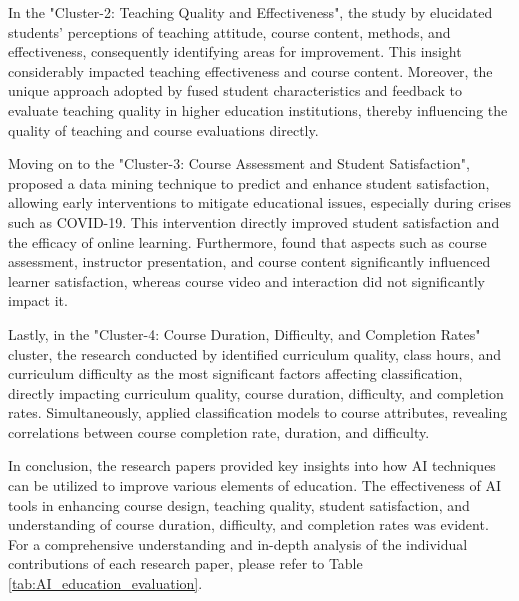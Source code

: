 In the "Cluster-2: Teaching Quality and Effectiveness", the study by \cite{Research_on_Project-Based_Teaching_Quality_Evaluation_Based_on_Fuzzy_Cluster_Analysis} elucidated students' perceptions of teaching attitude, course content, methods, and effectiveness, consequently identifying areas for improvement. This insight considerably impacted teaching effectiveness and course content. Moreover, the unique approach adopted by \cite{Evaluating_the_quality_of_teaching_in_higher_education_institutes_using_clustering_approach_and_set_pair_analysis} fused student characteristics and feedback to evaluate teaching quality in higher education institutions, thereby influencing the quality of teaching and course evaluations directly.

Moving on to the "Cluster-3: Course Assessment and Student Satisfaction", \cite{An_Efficient_Data_Mining_Technique_for_Assessing_Satisfaction_Level_With_Online_Learning_for_Higher_Education_Students_During_the_COVID-19} proposed a data mining technique to predict and enhance student satisfaction, allowing early interventions to mitigate educational issues, especially during crises such as COVID-19. This intervention directly improved student satisfaction and the efficacy of online learning. Furthermore, \cite{What_predicts_student_satisfaction_with_MOOCs:_A_gradient_boosting_trees_supervised_machine_learning_and_sentiment_analysis_approach} found that aspects such as course assessment, instructor presentation, and course content significantly influenced learner satisfaction, whereas course video and interaction did not significantly impact it.

Lastly, in the "Cluster-4: Course Duration, Difficulty, and Completion Rates" cluster, the research conducted by \cite{Competition_Neural_Network_Model_Application_in_the_Bilingual_Teaching_Quality_Evaluation_of_Universities} identified curriculum quality, class hours, and curriculum difficulty as the most significant factors affecting classification, directly impacting curriculum quality, course duration, difficulty, and completion rates. Simultaneously, \cite{Experience_in_learners_review_to_determine_attribute_relation_for_course_completion} applied classification models to course attributes, revealing correlations between course completion rate, duration, and difficulty.

In conclusion, the research papers provided key insights into how AI techniques can be utilized to improve various elements of education. The effectiveness of AI tools in enhancing course design, teaching quality, student satisfaction, and understanding of course duration, difficulty, and completion rates was evident. For a comprehensive understanding and in-depth analysis of the individual contributions of each research paper, please refer to Table \ref{tab:AI_education_evaluation}.

